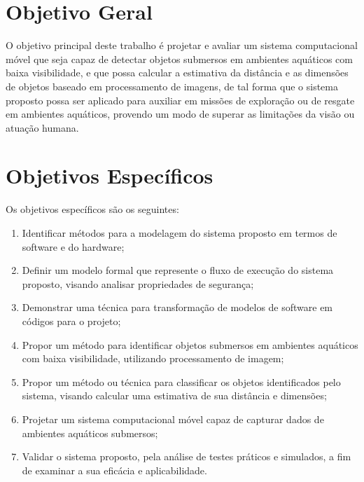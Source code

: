 


\section{Objetivo Geral}

O objetivo principal deste trabalho é projetar e avaliar um sistema computacional móvel que seja capaz de detectar objetos submersos em ambientes aquáticos com baixa visibilidade, e que possa calcular a estimativa da distância e as dimensões de objetos baseado em processamento de imagens, 
de tal forma que o sistema proposto possa ser aplicado para auxiliar em missões de exploração ou de resgate em ambientes aquáticos, provendo um modo de superar as limitações da visão ou atuação humana.

\section{Objetivos Específicos}
Os objetivos específicos são os seguintes:
\begin{enumerate}
	\item Identificar métodos para a modelagem do sistema proposto em termos de software e do hardware;

	\item Definir um modelo formal que represente o fluxo de execução do sistema proposto, visando analisar propriedades de segurança;

	\item Demonstrar uma técnica para transformação de modelos de software em códigos para o projeto;

	\item Propor um método para identificar objetos submersos em ambientes aquáticos com baixa visibilidade, utilizando processamento de imagem;

	\item Propor um método ou técnica para classificar os objetos identificados pelo sistema, visando calcular uma estimativa de sua distância e dimensões;

	\item Projetar um sistema computacional móvel capaz de capturar dados de ambientes aquáticos submersos;

	\item Validar o sistema proposto, pela análise de testes práticos e simulados, a fim de examinar a sua eficácia e aplicabilidade.

\end{enumerate}
    
